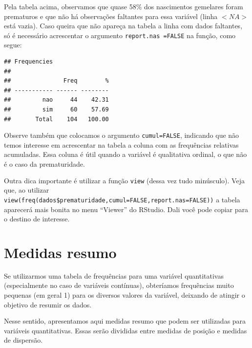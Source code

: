 \documentclass[
]{book}
\newenvironment{Shaded}{\begin{snugshade}}{\end{snugshade}}
\newcommand{\DataTypeTok}[1]{\textcolor[rgb]{0.13,0.29,0.53}{#1}}
\newcommand{\KeywordTok}[1]{\textcolor[rgb]{0.13,0.29,0.53}{\textbf{#1}}}
\newcommand{\NormalTok}[1]{#1}
\newcommand{\OperatorTok}[1]{\textcolor[rgb]{0.81,0.36,0.00}{\textbf{#1}}}
\newcommand{\OtherTok}[1]{\textcolor[rgb]{0.56,0.35,0.01}{#1}}
\begin{document}
Pela tabela acima, observamos que quase 58\% dos nascimentos gemelares foram prematuros e que não há observações faltantes para essa variável (linha \(<NA>\) está vazia). Caso queira que não apareça na tabela a linha com dados faltantes, só é necessário acrescentar o argumento \texttt{report.nas\ =FALSE} na função, como segue:

\begin{Shaded}
\end{Shaded}

\begin{verbatim}
## Frequencies  
## 
##               Freq        %
## ----------- ------ --------
##         nao     44    42.31
##         sim     60    57.69
##       Total    104   100.00
\end{verbatim}

Observe também que colocamos o argumento \texttt{cumul=FALSE}, indicando que não temos interesse em acrescentar na tabela a coluna com as frequências relativas acumuladas. Essa coluna é útil quando a variável é qualitativa ordinal, o que não é o caso da prematuridade.

Outra dica importante é utilizar a função \texttt{view} (dessa vez tudo minúsculo). Veja que, ao utilizar \texttt{view(freq(dados\$prematuridade,cumul=FALSE,report.nas=FALSE))} a tabela aparecerá mais bonita no menu ``Viewer'' do RStudio. Dali você pode copiar para o destino de interesse.

\hypertarget{medidas-resumo}{%
\section{Medidas resumo}\label{medidas-resumo}}

Se utilizarmos uma tabela de frequências para uma variável quantitativas (especialmente no caso de variáveis contínuas), obteríamos frequências muito pequenas (em geral 1) para os diversos valores da variável, deixando de atingir o objetivo de resumir os dados.

Nesse sentido, apresentamos aqui medidas resumo que podem ser utilizadas para variáveis quantitativas. Essas serão divididas entre medidas de posição e medidas de dispersão.
\end{document}
